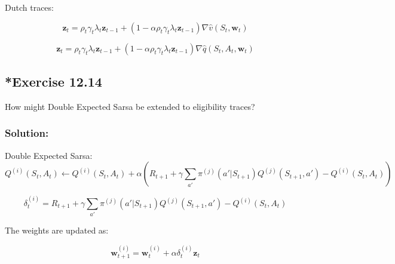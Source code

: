 Dutch traces:

\[
\mathbf{z}_t = \rho_t \gamma_t \lambda_t \mathbf{z}_{t-1} + \left(1 - \alpha \rho_t \gamma_t \lambda_t \mathbf{z}_{t-1}\right) \nabla \hat{v}(S_t, \mathbf{w}_t)
\]

\[
\mathbf{z}_t = \rho_t \gamma_t \lambda_t \mathbf{z}_{t-1} + \left(1 - \alpha \rho_t \gamma_t \lambda_t \mathbf{z}_{t-1}\right) \nabla \hat{q}(S_t, A_t, \mathbf{w}_t)
\]

\subsection*{*Exercise 12.14}
How might Double Expected Sarsa be extended to eligibility traces?


\subsubsection*{Solution:}

Double Expected Sarsa:
\[
Q^{(i)}(S_t, A_t) \leftarrow Q^{(i)}(S_t, A_t) + \alpha \left( R_{t+1} + \gamma \sum_{a'} \pi^{(j)}(a' | S_{t+1}) Q^{(j)}(S_{t+1}, a') - Q^{(i)}(S_t, A_t) \right)
\]


\[
\delta_t^{(i)} = R_{t+1} + \gamma \sum_{a'} \pi^{(j)}(a' | S_{t+1}) Q^{(j)}(S_{t+1}, a') - Q^{(i)}(S_t, A_t)
\]

The weights are updated as:

\[
\mathbf{w}_{t+1}^{(i)} = \mathbf{w}_t^{(i)} + \alpha \delta_t^{(i)} \mathbf{z}_t
\]


